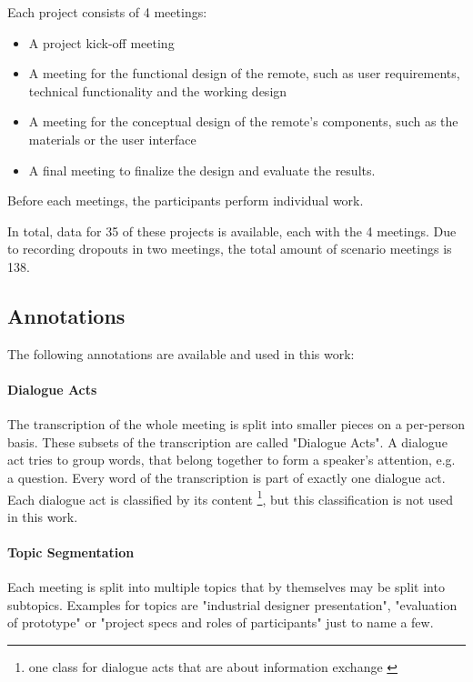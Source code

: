 Each project consists of 4 meetings:
\begin{itemize}
\item A project kick-off meeting
\item A meeting for the functional design of the remote, such as user requirements, technical functionality and the working design
\item A meeting for the conceptual design of the remote's components, such as the materials or the user interface
\item A final meeting to finalize the design and evaluate the results.
\end{itemize}
Before each meetings, the participants perform individual work.

In total, data for 35 of these projects is available, each with the 4 meetings. 
Due to recording dropouts in two meetings, the total amount of scenario meetings is 138. \cite[p.~2]{Mccowan05theami}

\subsection{Annotations}\label{ssec:ami-annotations}

The following annotations are available and used in this work:

\paragraph{Dialogue Acts}

The transcription of the whole meeting is split into smaller pieces on a per-person basis.
These subsets of the transcription are called "Dialogue Acts".
A dialogue act tries to group words, that belong together to form a speaker's attention, e.g. a question.
Every word of the transcription is part of exactly one dialogue act.
Each dialogue act is classified by its content \footnote{\Eg one class for dialogue acts that are about information exchange \cite[p.~8]{guidelinesAmiDA}}, but this classification is not used in this work. \cite{amiWebsite}

\paragraph{Topic Segmentation}

Each meeting is split into multiple topics that by themselves may be split into subtopics.
Examples for topics are "industrial designer presentation", "evaluation of prototype" or "project specs and roles of
participants" just to name a few. \cite{amiWebsite}

